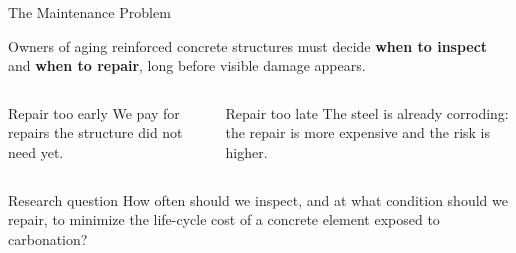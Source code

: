 \begin{frame}{The Maintenance Problem}

\justifying

Owners of aging reinforced concrete structures must decide
\textbf{when to inspect} and \textbf{when to repair}, long before visible damage appears.

\vspace{0.4cm}

\begin{columns}[T,onlytextwidth]
  \begin{alertblock}{Repair too early}
  \justifying
  We pay for repairs the structure did not need yet.
  \end{alertblock}

  \begin{alertblock}{Repair too late}
  \justifying
  The steel is already corroding: the repair is more expensive and the risk is higher.
  \end{alertblock}
\end{columns}

\vspace{0.5cm}

\begin{block}{Research question}
\justifying
How often should we inspect, and at what condition should we repair, to minimize the life-cycle cost of a concrete element exposed to carbonation?
\end{block}

\end{frame}
